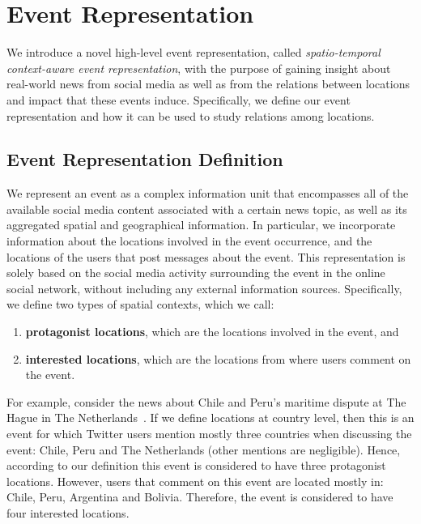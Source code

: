 \section{Event Representation}\label{sec:model}

We introduce a novel high-level event representation, called {\em
spatio-temporal context-aware event representation}, with the purpose of gaining
insight about real-world news from social media as well as from the relations
between locations and impact that these events induce. 
%
Specifically, we define our event representation and how it can be used to study
relations among locations.

\subsection{Event Representation Definition}\label{sec:model_definition}

We represent an event as a complex information unit that encompasses all of the
available social media content associated with a certain news topic, as well as
its aggregated spatial and geographical information.
%
%
%
In particular, we incorporate information about the locations involved in the
event occurrence, and the locations of the users that post messages about the
event. 
%
This representation is solely based on the social media activity surrounding the
event in the online social network, without including any external information
sources.
%
Specifically, we define two types of spatial contexts, which we call:
\begin{enumerate}
\item {\bf protagonist locations}, which are the locations involved in the
event, and
\item {\bf interested locations}, which are the locations from where users
comment on the event.
\end{enumerate}

For example, consider the news about Chile and Peru's maritime dispute at The
Hague in The Netherlands~\cite{bbc_peruchile}. 
%
If we define locations at country level, then this is an event for which Twitter
users mention mostly three countries when discussing the event: Chile, Peru and
The Netherlands (other mentions are negligible). 
%
Hence, according to our definition this event is considered to have three
protagonist locations. 
%
However, users that comment on this event are located mostly in: Chile, Peru,
Argentina and Bolivia. 
%
Therefore, the event is considered to have four interested locations.

